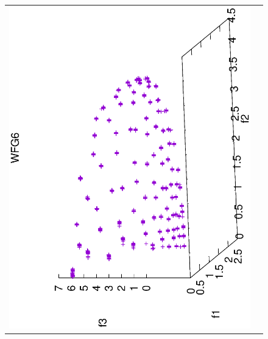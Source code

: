 \begin{figure}[H]
\begin{tabular}{cc}
  \includegraphics[scale=0.3, angle=-90,origin=c]{Figures_Chapter7/Results_Chapter4/Summary_Representative/VSD-MOEA-D/WFG6.eps} \\

\end{tabular}
\end{figure}
